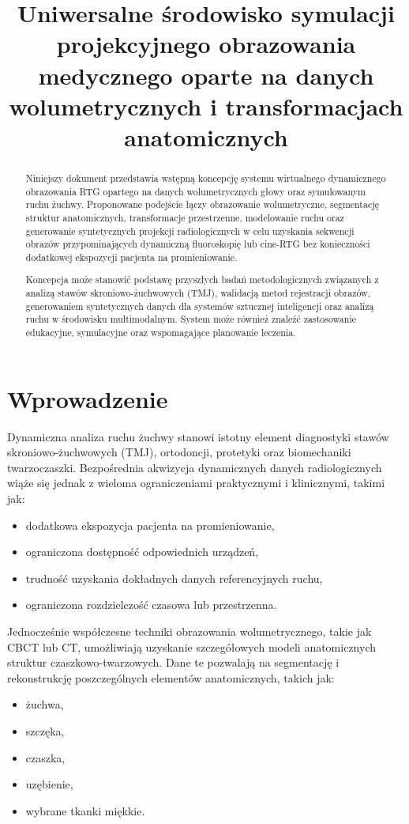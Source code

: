 \documentclass[11pt,a4paper]{article}
\title{Uniwersalne środowisko symulacji projekcyjnego obrazowania medycznego oparte na danych wolumetrycznych i transformacjach anatomicznych}
\date{}
\begin{document}
\maketitle

\begin{abstract}

Niniejszy dokument przedstawia wstępną koncepcję systemu wirtualnego dynamicznego obrazowania RTG opartego na danych wolumetrycznych głowy oraz symulowanym ruchu żuchwy. Proponowane podejście łączy obrazowanie wolumetryczne, segmentację struktur anatomicznych, transformacje przestrzenne, modelowanie ruchu oraz generowanie syntetycznych projekcji radiologicznych w celu uzyskania sekwencji obrazów przypominających dynamiczną fluoroskopię lub cine-RTG bez konieczności dodatkowej ekspozycji pacjenta na promieniowanie.

Koncepcja może stanowić podstawę przyszłych badań metodologicznych związanych z analizą stawów skroniowo-żuchwowych (TMJ), walidacją metod rejestracji obrazów, generowaniem syntetycznych danych dla systemów sztucznej inteligencji oraz analizą ruchu w środowisku multimodalnym. System może również znaleźć zastosowanie edukacyjne, symulacyjne oraz wspomagające planowanie leczenia.

\end{abstract}

\section{Wprowadzenie}

Dynamiczna analiza ruchu żuchwy stanowi istotny element diagnostyki stawów skroniowo-żuchwowych (TMJ), ortodoncji, protetyki oraz biomechaniki twarzoczaszki. Bezpośrednia akwizycja dynamicznych danych radiologicznych wiąże się jednak z wieloma ograniczeniami praktycznymi i klinicznymi, takimi jak:
\begin{itemize}
\item dodatkowa ekspozycja pacjenta na promieniowanie,
\item ograniczona dostępność odpowiednich urządzeń,
\item trudność uzyskania dokładnych danych referencyjnych ruchu,
\item ograniczona rozdzielczość czasowa lub przestrzenna.
\end{itemize}

Jednocześnie współczesne techniki obrazowania wolumetrycznego, takie jak CBCT lub CT, umożliwiają uzyskanie szczegółowych modeli anatomicznych struktur czaszkowo-twarzowych. Dane te pozwalają na segmentację i rekonstrukcję poszczególnych elementów anatomicznych, takich jak:
\begin{itemize}
\item żuchwa,
\item szczęka,
\item czaszka,
\item uzębienie,
\item wybrane tkanki miękkie.
\end{itemize}
\end{document}

